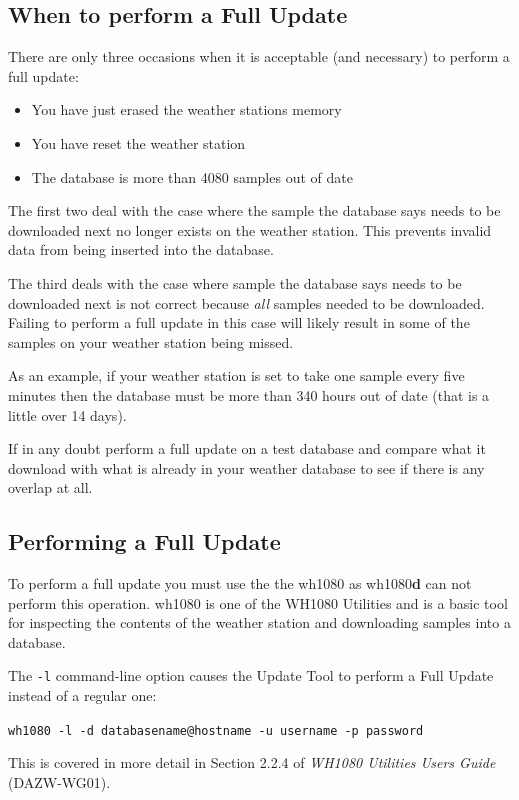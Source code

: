 \documentclass[a4paper,10pt,draft]{book}
\begin{document}
\subsection{When to perform a Full Update}
There are only three occasions when it is acceptable (and necessary) to perform a full update:
\begin{itemize}
\item You have just erased the weather stations memory
\item You have reset the weather station
\item The database is more than 4080 samples out of date
\end{itemize}

The first two deal with the case where the sample the database says needs to be downloaded next no longer exists on the weather station. This prevents invalid data from being inserted into the database.

The third deals with the case where sample the database says needs to be downloaded next is not correct because \emph{all} samples needed to be downloaded. Failing to perform a full update in this case will likely result in some of the samples on your weather station being missed.

As an example, if your weather station is set to take one sample every five minutes then the database must be more than 340 hours out of date (that is a little over 14 days).

If in any doubt perform a full update on a test database and compare what it download with what is already in your weather database to see if there is any overlap at all.

\subsection{Performing a Full Update}
To perform a full update you must use the the wh1080 as wh1080\textbf{d} can not perform this operation. wh1080 is one of the WH1080 Utilities and is a basic tool for inspecting the contents of the weather station and downloading samples into a database.

The \verb|-l| command-line option causes the Update Tool to perform a Full Update instead of a regular one:

\verb|wh1080 -l -d databasename@hostname -u username -p password|

This is covered in more detail in Section 2.2.4 of \emph{WH1080 Utilities Users Guide} (DAZW-WG01).
\end{document}
